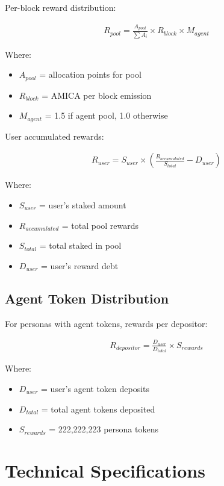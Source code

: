 \documentclass{article}
\begin{document}
\begin{appendices}
Per-block reward distribution:

\begin{align}
R_{pool} = \frac{A_{pool}}{\sum A_i} \times R_{block} \times M_{agent}
\end{align}

Where:
\begin{itemize}
    \item $A_{pool}$ = allocation points for pool
    \item $R_{block}$ = AMICA per block emission
    \item $M_{agent}$ = 1.5 if agent pool, 1.0 otherwise
\end{itemize}

User accumulated rewards:

\begin{align}
R_{user} = S_{user} \times \left(\frac{R_{accumulated}}{S_{total}} - D_{user}\right)
\end{align}

Where:
\begin{itemize}
    \item $S_{user}$ = user's staked amount
    \item $R_{accumulated}$ = total pool rewards
    \item $S_{total}$ = total staked in pool
    \item $D_{user}$ = user's reward debt
\end{itemize}

\subsection{Agent Token Distribution}

For personas with agent tokens, rewards per depositor:

\begin{align}
R_{depositor} = \frac{D_{user}}{D_{total}} \times S_{rewards}
\end{align}

Where:
\begin{itemize}
    \item $D_{user}$ = user's agent token deposits
    \item $D_{total}$ = total agent tokens deposited
    \item $S_{rewards}$ = 222,222,223 persona tokens
\end{itemize}

\section{Technical Specifications}


\end{appendices}
\end{document}
